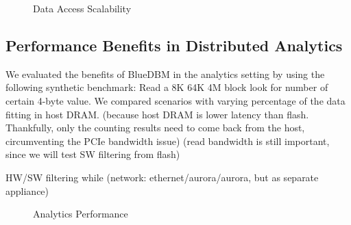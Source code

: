 \begin{figure}[h]
	\begin{center}
	\caption{Data Access Scalability}
	\label{fig:result_scalability}
	\end{center}
\end{figure}

%
%

\subsection{Performance Benefits in Distributed Analytics}

We evaluated the benefits of BlueDBM in the analytics setting by using the
following synthetic benchmark: Read a 8K 64K 4M block look for number of certain
4-byte value.
We compared scenarios with varying percentage of the data fitting in host DRAM.
(because host DRAM is lower latency than flash. Thankfully, only the counting
results need to come back from the host, circumventing the PCIe bandwidth issue)
(read bandwidth is still important, since we will test SW filtering from flash)

HW/SW filtering while (network: ethernet/aurora/aurora, but as separate
appliance)

\begin{figure}[h]
	\begin{center}
	\caption{Analytics Performance}
	\label{fig:result_analytics}
	\end{center}
\end{figure}
